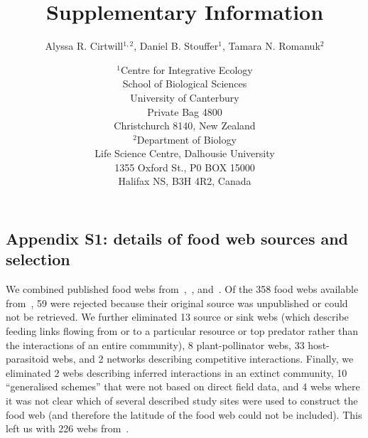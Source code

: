 \documentclass[12pt]{article}
\newcommand{\beginsupplement}{%
        \setcounter{table}{0}
        \renewcommand{\thetable}{S\arabic{table}}%
        \setcounter{figure}{0}
        \renewcommand{\thefigure}{S\arabic{figure}}%
     }
\begin{document}
\title{Supplementary Information}
\author{Alyssa R. Cirtwill$^{1,2}$, Daniel B. Stouffer$^{1}$, Tamara N. Romanuk$^{2}$}
\date{\footnotesize$^1$Centre for Integrative Ecology\\School of Biological Sciences\\University of Canterbury\\
Private Bag 4800\\Christchurch 8140, New Zealand \\
\medskip$^2$Department of Biology\\
Life Science Centre, Dalhousie University\\1355 Oxford St., P0 BOX 15000\\
Halifax NS, B3H 4R2, Canada\\}



\maketitle
\baselineskip=8.5mm

\vspace{0.4 in}
\beginsupplement
\linenumbers

\subsection*{Appendix S1: details of food web sources and selection}

  We combined published food webs from~\cite{GlobalWeb},~\cite{Riede2011},
  and~\cite{Dunne2013}. Of the 358 food webs available
  from~\cite{GlobalWeb}, 59 were rejected because their original source was
  unpublished or could not be retrieved. We further eliminated 13 source or
  sink webs (which describe feeding links flowing from or to a particular
  resource or top predator rather than the interactions of an entire
  community), 8 plant-pollinator webs, 33 host-parasitoid webs, and 2 networks
  describing competitive interactions. Finally, we eliminated 2 webs
  describing  inferred interactions in an extinct community, 10 ``generalised
  schemes'' that were not based on direct field data, and 4 webs where it was
  not clear which of several described study sites were used to construct the
  food web (and therefore the latitude of the food web could not be
  included). This left us with 226 webs from~\cite{GlobalWeb}.
\end{document}
